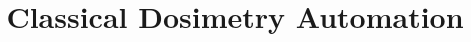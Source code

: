 \documentclass{article}
\title{Classical Dosimetry Automation}
\date{}
\begin{document}
	\maketitle
	\setcounter{tocdepth}{5}
	\tableofcontents
	
	\begin{abstract}
		
	\end{abstract}
	
	
	
	
	
	
	
\end{document}
